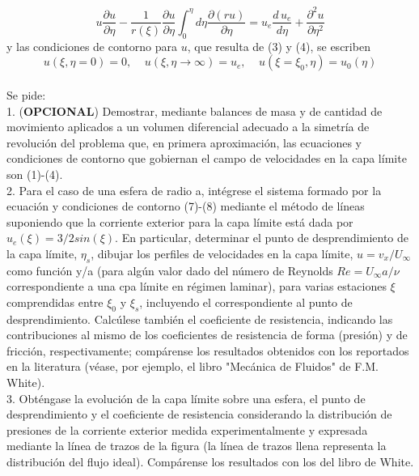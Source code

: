 \documentclass[11pt,a4paper]{article}
\begin{document}
\begin{equation}
u\frac{\partial u}{\partial \eta}-\frac{1}{r(\xi)} \frac{\partial u}{\partial \eta} \int_{0}^{\eta}d \eta \frac{\partial (ru)}{\partial \eta }=u_{e}\frac{d\, u_{e}}{d \eta} + \frac{\partial^{2} u}{\partial \eta^{2}}
\end{equation}
y las condiciones de contorno para $u$, que resulta de (3) y (4), se escriben
\begin{equation}
u(\xi,\eta=0)=0,\;\;\;\; u(\xi, \eta \rightarrow \infty)=u_{e},\;\;\;\; u(\xi=\xi_{0},\eta)=u_{0}(\eta)
\end{equation}
\\
Se pide:
\\

1. (\textbf {OPCIONAL}) Demostrar, mediante balances de masa y de cantidad de movimiento aplicados a un volumen diferencial adecuado a la simetría de revolución del problema que, en primera aproximación, las ecuaciones y condiciones de contorno que gobiernan el campo de velocidades en la capa límite son (1)-(4).
\\

2. Para el caso de una esfera de radio a, intégrese el sistema formado por la ecuación y condiciones de contorno (7)-(8) mediante el método de líneas suponiendo que la corriente exterior para la capa límite está dada por $u_{e}(\xi)=3/2sin(\xi)$. En particular, determinar el punto de desprendimiento de la capa límite, $\eta_{s}$, dibujar los perfiles de velocidades en la capa límite, $u=v_{x}/U_{\infty}$ como función y/a (para algún valor dado del número de Reynolds $Re=U_{\infty} a/\nu$ correspondiente a una cpa límite en régimen laminar), para varias estaciones $\xi$ comprendidas entre $\xi_{0}$ y $\xi_{s}$, incluyendo el correspondiente al punto de desprendimiento. Calcúlese también el coeficiente de resistencia, indicando las contribuciones al mismo de los coeficientes de resistencia de forma (presión) y de fricción, respectivamente; compárense los resultados obtenidos con los reportados en la literatura (véase, por ejemplo, el libro "Mecánica de Fluidos" de F.M. White).
\\

3. Obténgase la evolución de la capa límite sobre una esfera, el punto de desprendimiento y el coeficiente de resistencia considerando la distribución de presiones de la corriente exterior medida experimentalmente y expresada mediante la línea de trazos de la figura (la línea de trazos llena representa la distribución del flujo ideal). Compárense los resultados con los del libro de White.
\\
\end{document}
